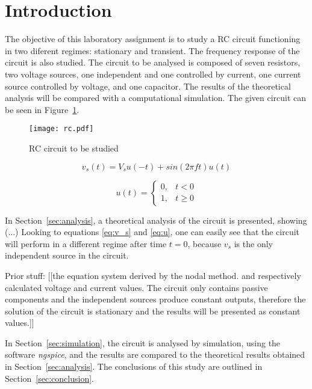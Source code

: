 \section{Introduction}
\label{sec:introduction}

\par The objective of this laboratory assignment is to study a RC circuit functioning in two diferent regimes: stationary and transient. The frequency response of the circuit is also studied. The circuit to be analysed is composed of seven resistors, two voltage sources, one independent and one controlled by current, one current source controlled by voltage, and one capacitor. The results of the theoretical analysis will be compared with a computational simulation. The given circuit can be seen in Figure~\ref{fig:circuit}. 

\begin{figure}[H]
\centering
\texttt{[image: rc.pdf]}
\caption{RC circuit to be studied}
\label{fig:circuit}
\end{figure}

\begin{multicols}{2}
\begin{equation}
    v_s(t) = V_s u(-t) + sin(2 \pi ft) u(t) 
    \label{eq:v_s}
\end{equation}

\begin{equation}
    u(t) = \left \{ \begin{matrix} 0, & t<0 \\ 1, & t\geqslant 0 \end{matrix} \right.
    \label{eq:u}
\end{equation}
\end{multicols}

\par In Section~\ref{sec:analysis}, a theoretical analysis of the circuit is presented, showing (...) Looking to equations \ref{eq:v_s} and \ref{eq:u}, one can easily see that the circuit will perform in a different regime after time $t=0$, because $v_s$ is the only independent source in the circuit. 
\par Prior stuff: [[the equation system derived by the nodal method.  and respectively calculated voltage and current values. The circuit only contains passive components and the independent sources produce constant outputs, therefore the solution of the circuit is stationary and the results will be presented as constant values.]]

\par In Section~\ref{sec:simulation}, the circuit is analysed by
simulation, using the software \textit{ngspice}, and the results are compared to the theoretical results obtained in
Section~\ref{sec:analysis}. The conclusions of this study are outlined in Section~\ref{sec:conclusion}.


